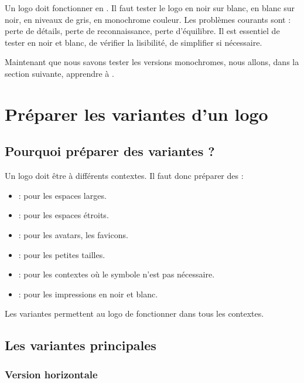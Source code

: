 Un logo doit fonctionner en . Il faut tester le logo en noir sur blanc, en blanc sur noir, en niveaux de gris, en monochrome couleur. Les problèmes courants sont : perte de détails, perte de reconnaissance, perte d'équilibre. Il est essentiel de tester en noir et blanc, de vérifier la lisibilité, de simplifier si nécessaire.

Maintenant que nous savons tester les versions monochromes, nous allons, dans la section suivante, apprendre à .

\section{Préparer les variantes d'un logo}

\subsection{Pourquoi préparer des variantes ?}

Un logo doit être  à différents contextes. Il faut donc préparer des  :

\begin{itemize}
    \item {} : pour les espaces larges.
    \item {} : pour les espaces étroits.
    \item {} : pour les avatars, les favicons.
    \item {} : pour les petites tailles.
    \item {} : pour les contextes où le symbole n'est pas nécessaire.
    \item {} : pour les impressions en noir et blanc.
\end{itemize}

Les variantes permettent au logo de fonctionner dans tous les contextes.

\subsection{Les variantes principales}

\subsubsection{Version horizontale}

